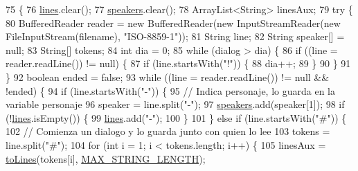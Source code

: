 \begin{DoxyCode}
75                                                                      \{
76         \mbox{\hyperlink{classgui_1_1_dialogue_a83efa9d7d08512fd59390c8ecaade1f7}{lines}}.clear();
77         \mbox{\hyperlink{classgui_1_1_dialogue_a0c75cc6f6e28bb1c6807d78a11adf807}{speakers}}.clear();
78         ArrayList<String> linesAux;
79         \textcolor{keywordflow}{try} \{
80             BufferedReader reader = \textcolor{keyword}{new} BufferedReader(\textcolor{keyword}{new} InputStreamReader(\textcolor{keyword}{new} FileInputStream(filename),
       \textcolor{stringliteral}{"ISO-8859-1"}));
81             String line;
82             String speaker[] = null;
83             String[] tokens;
84             \textcolor{keywordtype}{int} dia = 0;
85             \textcolor{keywordflow}{while} (dialog > dia) \{
86                 \textcolor{keywordflow}{if} ((line = reader.readLine()) != null) \{
87                     \textcolor{keywordflow}{if} (line.startsWith(\textcolor{stringliteral}{"!"})) \{
88                         dia++;
89                     \}
90                 \}
91             \}
92             \textcolor{keywordtype}{boolean} ended = \textcolor{keyword}{false};
93             \textcolor{keywordflow}{while} ((line = reader.readLine()) != null && !ended) \{
94                 \textcolor{keywordflow}{if} (line.startsWith(\textcolor{stringliteral}{"-"})) \{
95                     \textcolor{comment}{// Indica personaje, lo guarda en la variable personaje}
96                     speaker = line.split(\textcolor{stringliteral}{"-"});
97                     \mbox{\hyperlink{classgui_1_1_dialogue_a0c75cc6f6e28bb1c6807d78a11adf807}{speakers}}.add(speaker[1]);
98                     \textcolor{keywordflow}{if} (!\mbox{\hyperlink{classgui_1_1_dialogue_a83efa9d7d08512fd59390c8ecaade1f7}{lines}}.isEmpty()) \{
99                         \mbox{\hyperlink{classgui_1_1_dialogue_a83efa9d7d08512fd59390c8ecaade1f7}{lines}}.add(\textcolor{stringliteral}{"-"});
100                     \}
101                 \} \textcolor{keywordflow}{else} \textcolor{keywordflow}{if} (line.startsWith(\textcolor{stringliteral}{"#"})) \{
102                     \textcolor{comment}{// Comienza un dialogo y lo guarda junto con quien lo lee}
103                     tokens = line.split(\textcolor{stringliteral}{"#"});
104                     \textcolor{keywordflow}{for} (\textcolor{keywordtype}{int} i = 1; i < tokens.length; i++) \{
105                         linesAux = \mbox{\hyperlink{classgui_1_1_dialogue_a6460a4797c6ca33824d8e548489bf722}{toLines}}(tokens[i], \mbox{\hyperlink{classgui_1_1_dialogue_a93e1652100d34187a3c0bbf5ac3b4dca}{MAX\_STRING\_LENGTH}});

\end{DoxyCode}
